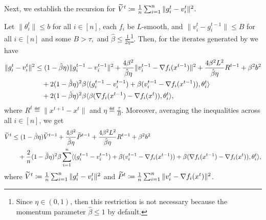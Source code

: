 \documentclass[a4paper,11pt]{article}
\begin{document}
Next, we establish the recursion for $\widetilde{V}^t \coloneqq \frac{1}{n}\sum_{i=1}^n\|g_i^{t} - v_i^{t}\|^2$.
\begin{lemma}\label{lem:descent_Vt_tilde_dp}
    Let $\|\theta^t_i\|\le b$ for all $i\in[n]$, each $f_i$ be $L$-smooth, and $\|v_i^{t} - g_i^{t-1}\| \le B$ for all $i\in[n]$ and some $B > \tau,$ and $\hat{\beta} \le \frac{1}{2\eta}$\footnote{Since $\eta \in (0,1)$, then this restriction is not necessary because the momentum parameter $\hat{\beta} \le 1$ by default.}. Then, for the iterates generated by  we have 
    \begin{align}
    \|g_i^{t} - v_i^{t}\|^2 &\le (1-\hat{\beta}\eta)\|g_i^{t-1}- v_i^{t-1}\|^2 
    + \frac{4\beta^2}{\hat{\beta}\eta}\|v_i^{t-1} - \nabla f_i(x^{t-1})\|^2 
    + \frac{4\beta^2L^2}{\hat{\beta}\eta}R^{t-1}
    + \beta^2b^2\\
    &\quad + 2(1-\hat{\beta}\eta)^2\beta\<(g_i^{t-1} - v_i^{t-1}) + \beta(v_i^{t-1} - \nabla f_i(x^{t-1})), \theta^t_i>\notag\\
    &\quad + 2(1-\hat{\beta}\eta)^2\beta\<\beta(\nabla f_i(x^{t-1})-\nabla f_i(x^t)), \theta^t_i>,\notag
    \end{align}
    where $R^t \eqdef \|x^{t+1} - x^t\|$ and $\eta \eqdef \frac{\tau}{B}$. Moreover, averaging the inequalities across all $i\in[n]$, we get
    \begin{align}
    \wtilde{V}^{t} &\le (1-\hat{\beta}\eta)\wtilde{V}^{t-1} 
    + \frac{4\beta^2}{\hat{\beta}\eta}\wtilde{P}^{t-1}
    + \frac{4\beta^2L^2}{\hat{\beta}\eta}R^{t-1}
    + \beta^2b^2\\
    &\quad + \frac{2}{n}(1-\hat{\beta}\eta)^2\beta\sum_{i=1}^n\<(g_i^{t-1} - v_i^{t-1}) + \beta(v_i^{t-1} - \nabla f_i(x^{t-1})) + \beta(\nabla f_i(x^{t-1})-\nabla f_i(x^t)), \theta^t_i>,\notag
    \end{align}
    where $\widetilde{V}^t \coloneqq \frac{1}{n}\sum_{i=1}^n\|g_i^{t} - v_i^{t}\|^2$ and $\widetilde{P}^t \coloneqq \frac{1}{n}\sum_{i=1}^n\|v_i^t - \nabla f_i(x^t)\|^2$.
\end{lemma}
\end{document}
